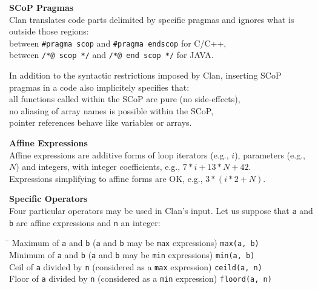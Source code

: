 \documentclass[landscape,a4paper]{article}
\begin{document}
\begin{multicols}{3}
\begin{small}
\vspace{0.2cm}
\textbf{SCoP Pragmas}\\
Clan translates code parts delimited by specific pragmas and
ignores what is outside those regions:\\
 between {\tt \#pragma scop} and {\tt \#pragma endscop} for C/C++,\\
 between {\tt /*@ scop */} and {\tt /*@ end scop */} for JAVA.

\vspace{0.1cm}
In addition to the syntactic restrictions imposed by Clan, inserting
SCoP pragmas in a code also implicitely specifies that:\\
 all functions called within the SCoP are pure (no side-effects),\\
 no aliasing of array names is possible within the SCoP,\\
 pointer references behave like variables or arrays.

\vspace{0.2cm}
\textbf{Affine Expressions}\\
Affine expressions are additive forms of loop iterators (e.g., $i$),
parameters (e.g., $N$) and integers, with integer coefficients, e.g.,
$7*i + 13*N + 42$.\\
 Expressions simplifying to affine forms are OK, e.g., $3*(i*2 + N)$.

\vspace{0.2cm}
\textbf{Specific Operators}\\
Four particular operators may be used in Clan's input. Let us suppose that
{\tt a} and {\tt b} are affine expressions and {\tt n} an integer:
\vspace{-0.2cm}
\begin{tabbing}
\hskip 205pt \= \kill
Maximum of {\tt a} and {\tt b} ({\tt a} and {\tt b} may be {\tt max} expressions) \> {\tt max(a, b)} \\
Minimum of {\tt a} and {\tt b} ({\tt a} and {\tt b} may be {\tt min} expressions) \> {\tt min(a, b)} \\
Ceil  of {\tt a} divided by {\tt n} (considered as a {\tt max} expression)      \> {\tt ceild(a, n)} \\
Floor of {\tt a} divided by {\tt n} (considered as a {\tt min} expression)      \> {\tt floord(a, n)}
\end{tabbing}
\end{small}


\end{multicols}
\end{document}
